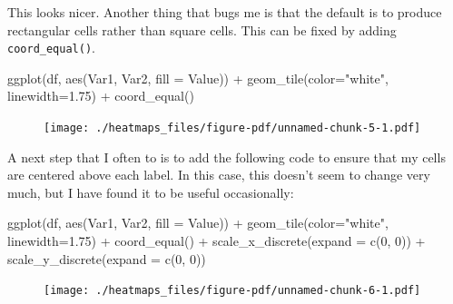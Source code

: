 \documentclass[
  letterpaper,
  DIV=11,
  numbers=noendperiod]{scrreprt}
\newenvironment{Shaded}{\begin{snugshade}}{\end{snugshade}}
\newcommand{\AttributeTok}[1]{\textcolor[rgb]{0.40,0.45,0.13}{#1}}
\newcommand{\DecValTok}[1]{\textcolor[rgb]{0.68,0.00,0.00}{#1}}
\newcommand{\FloatTok}[1]{\textcolor[rgb]{0.68,0.00,0.00}{#1}}
\newcommand{\FunctionTok}[1]{\textcolor[rgb]{0.28,0.35,0.67}{#1}}
\newcommand{\NormalTok}[1]{\textcolor[rgb]{0.00,0.23,0.31}{#1}}
\newcommand{\SpecialCharTok}[1]{\textcolor[rgb]{0.37,0.37,0.37}{#1}}
\newcommand{\StringTok}[1]{\textcolor[rgb]{0.13,0.47,0.30}{#1}}
\begin{document}
This looks nicer. Another thing that bugs me is that the default is to
produce rectangular cells rather than square cells. This can be fixed by
adding \texttt{coord\_equal()}.

\begin{Shaded}
\begin{Highlighting}[]
\FunctionTok{ggplot}\NormalTok{(df, }\FunctionTok{aes}\NormalTok{(Var1, Var2, }\AttributeTok{fill =}\NormalTok{ Value)) }\SpecialCharTok{+} 
  \FunctionTok{geom\_tile}\NormalTok{(}\AttributeTok{color=}\StringTok{"white"}\NormalTok{, }\AttributeTok{linewidth=}\FloatTok{1.75}\NormalTok{) }\SpecialCharTok{+}
  \FunctionTok{coord\_equal}\NormalTok{()}
\end{Highlighting}
\end{Shaded}

\begin{figure}[H]

{\centering \texttt{[image: ./heatmaps\_files/figure-pdf/unnamed-chunk-5-1.pdf]}

}

\end{figure}

A next step that I often to is to add the following code to ensure that
my cells are centered above each label. In this case, this doesn't seem
to change very much, but I have found it to be useful occasionally:

\begin{Shaded}
\begin{Highlighting}[]
\FunctionTok{ggplot}\NormalTok{(df, }\FunctionTok{aes}\NormalTok{(Var1, Var2, }\AttributeTok{fill =}\NormalTok{ Value)) }\SpecialCharTok{+} 
  \FunctionTok{geom\_tile}\NormalTok{(}\AttributeTok{color=}\StringTok{"white"}\NormalTok{, }\AttributeTok{linewidth=}\FloatTok{1.75}\NormalTok{) }\SpecialCharTok{+}
  \FunctionTok{coord\_equal}\NormalTok{() }\SpecialCharTok{+}
  \FunctionTok{scale\_x\_discrete}\NormalTok{(}\AttributeTok{expand =} \FunctionTok{c}\NormalTok{(}\DecValTok{0}\NormalTok{, }\DecValTok{0}\NormalTok{)) }\SpecialCharTok{+}
  \FunctionTok{scale\_y\_discrete}\NormalTok{(}\AttributeTok{expand =} \FunctionTok{c}\NormalTok{(}\DecValTok{0}\NormalTok{, }\DecValTok{0}\NormalTok{)) }
\end{Highlighting}
\end{Shaded}

\begin{figure}[H]

{\centering \texttt{[image: ./heatmaps\_files/figure-pdf/unnamed-chunk-6-1.pdf]}

}

\end{figure}
\end{document}
